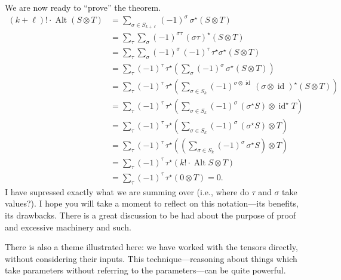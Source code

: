 \documentclass[12pt]{article}
\DeclareMathOperator{\Alt}{Alt}
\DeclareMathOperator{\id}{id}
\theoremstyle{definition}
\begin{document}
We are now ready to ``prove'' the theorem.
\begin{align*}
(k + \ell)! \cdot \Alt(S \otimes T)
&= \sum_{\sigma \in S_{k + \ell}} (-1)^{\sigma} \, \sigma^\star (S \otimes T) \\
&= \sum_{\tau} \sum_{\sigma} (-1)^{\sigma \tau} \, (\sigma \tau)^\star  (S \otimes T) \\
&= \sum_{\tau} \sum_{\sigma} (-1)^{\sigma} \, (-1)^{\tau} \, \tau^\star \sigma^\star (S \otimes T) \\
&= \sum_{\tau} (-1)^{\tau} \, \tau^\star \left( \sum_{\sigma} (-1)^{\sigma} \, \sigma^\star (S \otimes T) \right) \\
&= \sum_{\tau} (-1)^{\tau} \, \tau^\star \left( \sum_{\sigma \in S_k} (-1)^{\sigma \otimes \id} \, (\sigma \otimes \id)^\star (S \otimes T) \right) \\
&= \sum_{\tau} (-1)^{\tau} \, \tau^\star \left( \sum_{\sigma \in S_k} (-1)^{\sigma} \, (\sigma^\star S) \otimes \id^\star T \right) \\
&= \sum_{\tau} (-1)^{\tau} \, \tau^\star \left( \sum_{\sigma \in S_k} (-1)^{\sigma} \, (\sigma^\star S) \otimes T \right) \\
&= \sum_{\tau} (-1)^{\tau} \, \tau^\star \left( \left( \sum_{\sigma \in S_k} (-1)^{\sigma} \, \sigma^\star S \right) \otimes T \right) \\
&= \sum_{\tau} (-1)^{\tau} \, \tau^\star \left( k! \cdot \Alt S \otimes T \right) \\
&= \sum_{\tau} (-1)^{\tau} \, \tau^\star \left( 0 \otimes T \right) = 0.
\end{align*}
I have supressed exactly what we are summing over (i.e., where do
$\tau$ and $\sigma$ take values?).  I hope you will take a moment to
reflect on this notation---its benefits, its drawbacks.  There is a
great discussion to be had about the purpose of
proof
and excessive machinery and such.

There is also a theme illustrated here: we have worked with the
tensors directly, without considering their inputs.  This
technique---reasoning about things which take parameters without
referring to the parameters---can be quite powerful.
\end{document}
